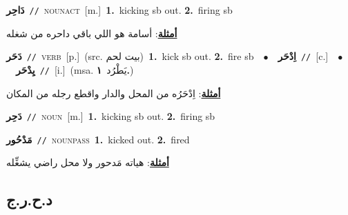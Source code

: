 \documentclass[10pt,a4paper,twoside]{article} %
\begin{document}
\begin{multicols}{2}
{\setlength\topsep{0pt}\textbf{\foreignlanguage{arabic}{دَاحِر}}\ {\color{gray}\texttt{//}\color{black}}\ \textsc{noun\textunderscore act}\ [m.]\ \textbf{1.}~kicking sb out.  \textbf{2.}~firing sb\  \begin{flushright}\color{gray}\foreignlanguage{arabic}{\textbf{\underline{\foreignlanguage{arabic}{أمثلة}}}: أسامة هو اللي باقي داحره من شغله}\end{flushright}\color{black}} \vspace{2mm}

{\setlength\topsep{0pt}\textbf{\foreignlanguage{arabic}{دَحَر}}\ {\color{gray}\texttt{//}\color{black}}\ \textsc{verb}\ [p.]\ (src. \color{gray}\foreignlanguage{arabic}{بيت لحم}\color{black})\ \textbf{1.}~kick sb out.  \textbf{2.}~fire sb\ \ $\bullet$\ \ \setlength\topsep{0pt}\textbf{\foreignlanguage{arabic}{اِدْحَر}}\ {\color{gray}\texttt{//}\color{black}}\ [c.]\ \ $\bullet$\ \ \setlength\topsep{0pt}\textbf{\foreignlanguage{arabic}{يِدْحَر}}\ {\color{gray}\texttt{//}\color{black}}\ [i.]\ \color{gray}(msa. \foreignlanguage{arabic}{يَطْرُد}~\foreignlanguage{arabic}{\textbf{١.}})\color{black}\  \begin{flushright}\color{gray}\foreignlanguage{arabic}{\textbf{\underline{\foreignlanguage{arabic}{أمثلة}}}: اِدْحَرُه من المحل والدار واقطع رجله من المكان}\end{flushright}\color{black}} \vspace{2mm}

{\setlength\topsep{0pt}\textbf{\foreignlanguage{arabic}{دَحِر}}\ {\color{gray}\texttt{//}\color{black}}\ \textsc{noun}\ [m.]\ \textbf{1.}~kicking sb out.  \textbf{2.}~firing sb\ } \vspace{2mm}

{\setlength\topsep{0pt}\textbf{\foreignlanguage{arabic}{مَدْحُور}}\ {\color{gray}\texttt{//}\color{black}}\ \textsc{noun\textunderscore pass}\ \textbf{1.}~kicked out.  \textbf{2.}~fired\  \begin{flushright}\color{gray}\foreignlanguage{arabic}{\textbf{\underline{\foreignlanguage{arabic}{أمثلة}}}: هياته مَدحور ولا محل راضي يشغِّله}\end{flushright}\color{black}} \vspace{2mm}

\vspace{-3mm}
\subsection*{\color{blue}\foreignlanguage{arabic}{د.ح.ر.ج}\color{blue}{}} 


\end{multicols}
\end{document}
